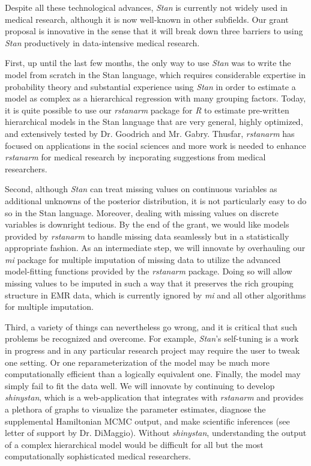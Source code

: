 \documentclass[11pt,notitlepage]{article}
\begin{document}
Despite all these technological advances, \textit{Stan} is currently not widely used
in medical research, although it is now well-known in other subfields. Our grant
proposal is innovative in the sense that it will break down three barriers to using
\textit{Stan} productively in data-intensive medical research. 

First, up until the last few months, the only way to use \textit{Stan} was to write the 
model from scratch in the Stan language, which requires considerable expertise in 
probability theory and substantial experience using \textit{Stan} in order to estimate
a model as complex as a hierarchical regression with many grouping factors. Today, it
is quite possible to use our \textit{rstanarm} package for \textit{R} to estimate
pre-written hierarchical models in the Stan language that are very general, highly
optimized, and extensively tested by Dr. Goodrich and Mr. Gabry. Thusfar, \textit{rstanarm}
has focused on applications in the social sciences and more work is needed to enhance
\textit{rstanarm} for medical research by incporating suggestions from medical researchers.

Second, although \textit{Stan} can treat missing values on continuous variables as 
additional unknowns of the posterior distribution, it is not particularly easy to do so
in the Stan language. Moreover, dealing with missing values on discrete variables is
downright tedious. By the end of the grant, we would like models provided by 
\textit{rstanarm} to handle missing data seamlessly but in a statistically appropriate
fashion. As an intermediate step, we will innovate by overhauling our \textit{mi}
package for multiple imputation of missing data to utilize the advanced model-fitting
functions provided by the \textit{rstanarm} package. Doing so will allow missing values
to be imputed in such a way that it preserves the rich grouping structure in EMR data, 
which is currently ignored by \textit{mi} and all other algorithms for multiple imputation.

Third, a variety of things can nevertheless go wrong, and it is critical that such
problems be recognized and overcome. For example, \textit{Stan}'s self-tuning is a 
work in progress and in any particular research project may require the user to tweak 
one setting. Or one reparameterization of the model may be much more computationally efficient 
than a logically equivalent one. Finally, the model may simply fail to fit the data well.
We will innovate by continuing to develop \textit{shinystan}, which is a web-application
that integrates with \textit{rstanarm} and provides a plethora of graphs to visualize the 
parameter estimates, diagnose the supplemental Hamiltonian MCMC output, and make scientific
inferences (see letter of support by Dr. DiMaggio). Without \textit{shinystan}, understanding 
the output of a complex hierarchical model would be difficult for all but the most computationally 
sophisticated medical researchers.
\end{document}
